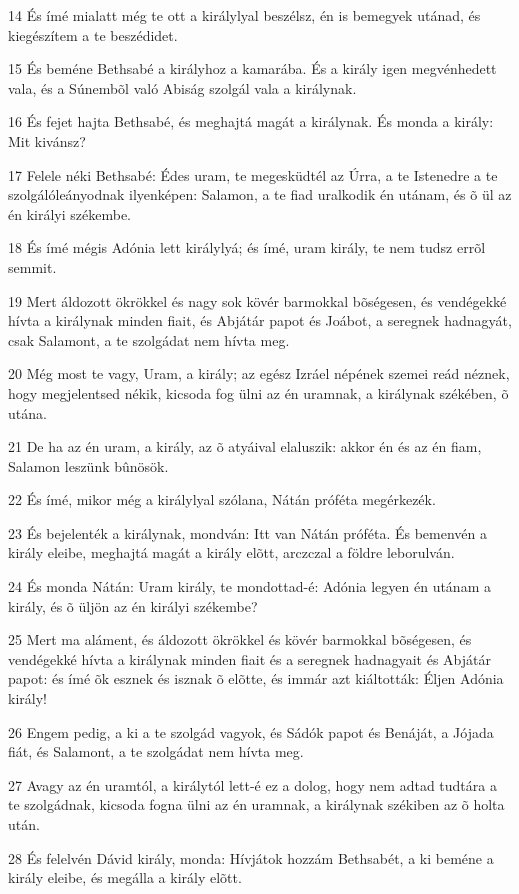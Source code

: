 \par 14 És ímé mialatt még te ott a királylyal beszélsz, én is bemegyek utánad, és kiegészítem a te beszédidet.
\par 15 És beméne Bethsabé a királyhoz a kamarába. És a király igen megvénhedett vala, és a Súnembõl való Abiság szolgál vala a királynak.
\par 16 És fejet hajta Bethsabé, és meghajtá magát a királynak. És monda a király: Mit kivánsz?
\par 17 Felele néki Bethsabé: Édes uram, te megesküdtél az Úrra, a te Istenedre a te szolgálóleányodnak ilyenképen: Salamon,  a te fiad uralkodik én utánam, és õ ül az én királyi székembe.
\par 18 És ímé mégis Adónia lett királylyá; és ímé, uram király, te nem tudsz errõl semmit.
\par 19 Mert áldozott ökrökkel és nagy sok kövér barmokkal bõségesen, és vendégekké hívta a királynak minden fiait, és Abjátár papot és Joábot, a seregnek hadnagyát, csak Salamont, a te szolgádat nem hívta meg.
\par 20 Még most te vagy, Uram, a király; az egész Izráel népének szemei reád néznek, hogy megjelentsed nékik, kicsoda fog ülni az én uramnak, a királynak székében, õ utána.
\par 21 De ha az én uram, a király, az õ atyáival elaluszik: akkor én és az én fiam, Salamon leszünk bûnösök.
\par 22 És ímé, mikor még a királylyal szólana, Nátán próféta megérkezék.
\par 23 És bejelenték a királynak, mondván: Itt van Nátán próféta. És bemenvén a király eleibe, meghajtá magát a király elõtt, arczczal a földre leborulván.
\par 24 És monda Nátán: Uram király, te mondottad-é: Adónia legyen én utánam a király, és õ üljön az én királyi székembe?
\par 25 Mert ma aláment, és áldozott ökrökkel és kövér barmokkal bõségesen, és vendégekké hívta a királynak minden fiait és a seregnek hadnagyait és Abjátár papot: és ímé õk esznek és isznak õ elõtte, és immár azt kiáltották: Éljen Adónia király!
\par 26 Engem pedig, a ki a te szolgád vagyok, és Sádók papot és Benáját, a Jójada fiát, és Salamont, a te szolgádat nem hívta meg.
\par 27 Avagy az én uramtól, a királytól lett-é ez a dolog, hogy nem adtad tudtára a te szolgádnak, kicsoda fogna ülni az én uramnak, a királynak székiben az õ holta után.
\par 28 És felelvén Dávid király, monda: Hívjátok hozzám Bethsabét, a ki beméne a király eleibe, és megálla a király elõtt.
